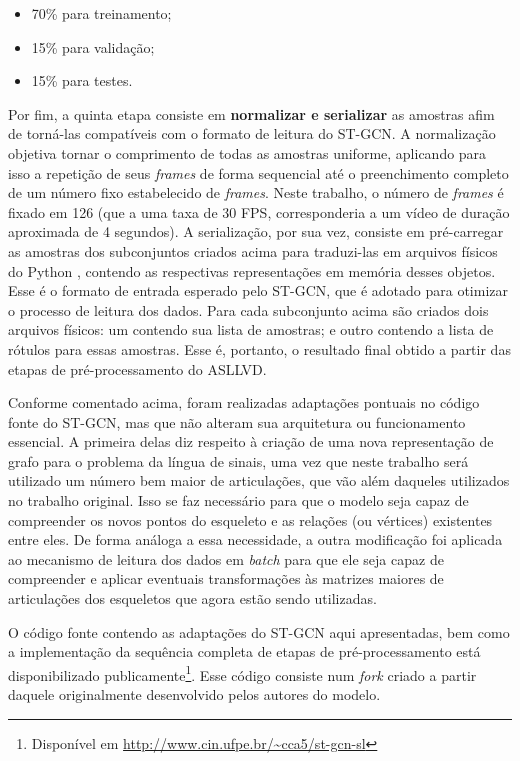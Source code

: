 \begin{itemize}
    \item 70\% para treinamento;
    \item 15\% para validação;
    \item 15\% para testes.
\end{itemize}

Por fim, a quinta etapa consiste em \textbf{normalizar e serializar} as amostras afim de torná-las compatíveis com o formato de leitura do ST-GCN. A normalização objetiva tornar o comprimento de todas as amostras uniforme, aplicando para isso a repetição de seus \textit{frames} de forma sequencial até o preenchimento completo de um número fixo estabelecido de \textit{frames}. Neste trabalho, o número de \textit{frames} é fixado em 126 (que a uma taxa de 30 FPS, corresponderia a um vídeo de duração aproximada de 4 segundos). A serialização, por sua vez, consiste em pré-carregar as amostras dos subconjuntos criados acima para traduzi-las em arquivos físicos do Python \cite{python}, contendo as respectivas representações em memória desses objetos. Esse é o formato de entrada esperado pelo ST-GCN, que é adotado para otimizar o processo de leitura dos dados. Para cada subconjunto acima são criados dois arquivos físicos: um contendo sua lista de amostras; e outro contendo a lista de rótulos para essas amostras. Esse é, portanto, o resultado final obtido a partir das etapas de pré-processamento do ASLLVD.

Conforme comentado acima, foram realizadas adaptações pontuais no código fonte do ST-GCN, mas que não alteram sua arquitetura ou funcionamento essencial. A primeira delas diz respeito à criação de uma nova representação de grafo para o problema da língua de sinais, uma vez que neste trabalho será utilizado um número bem maior de articulações, que vão além daqueles utilizados no trabalho original. Isso se faz necessário para que o modelo seja capaz de compreender os novos pontos do esqueleto e as relações (ou vértices) existentes entre eles. De forma análoga a essa necessidade, a outra modificação foi aplicada ao mecanismo de leitura dos dados em \textit{batch} para que ele seja capaz de compreender e aplicar eventuais transformações às matrizes maiores de articulações dos esqueletos que agora estão sendo utilizadas. 

O código fonte contendo as adaptações do ST-GCN aqui apresentadas, bem como a implementação da sequência completa de etapas de pré-processamento está disponibilizado publicamente\footnote{
    Disponível em \url{http://www.cin.ufpe.br/~cca5/st-gcn-sl}
}. Esse código consiste num \textit{fork} criado a partir daquele originalmente desenvolvido pelos autores do modelo.

